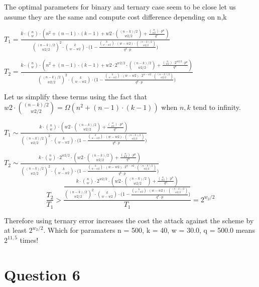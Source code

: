\documentclass[12pt]{article}
\begin{document}
The optimal parameters for binary and ternary case seem to be close let us assume they are the same and compute cost difference depending on n,k


$T_1 = \frac{ k \cdot  \binom{n}{w} \cdot  (n^2 + (n-1)\cdot (k-1) + w2\cdot \binom{(n-k)/2}{w2/2} + \frac{\binom{n}{w2}\cdot p^n}{q^n})}{\binom{(n-k)/2}{w2/2}^2 \cdot  \binom{k}{w-w2} \cdot  \big( 1 - \frac{\binom{k}{w-w2} \cdot  (w-w2) \cdot  \binom{(n-k)/2}{w2/2} }{ q^{k}\cdot p } \big)}$


$T_2 = \frac{ k \cdot  \binom{n}{w} \cdot  (n^2 + (n-1)\cdot (k-1) + w2\cdot 2^{w2/2}\cdot \binom{(n-k)/2}{w2/2} + \frac{\binom{n}{w2}\cdot 2^{w2/2}\cdot p^n}{q^n})}{\binom{(n-k)/2}{w2/2}^2 \cdot  \binom{k}{w-w2} \cdot  \big( 1 - \frac{\binom{k}{w-w2} \cdot  (w-w2) \cdot  2^{w-w2} \cdot  \binom{(n-k)/2}{w2/2} }{ q^{k}\cdot p } \big)}$

Let us simplify these terms using the fact that $w2\cdot \binom{(n-k)/2}{w2/2} = \Omega(n^2 + (n-1)\cdot (k-1))$ when $n,k$ tend to infinity.

$T_1 \sim \frac{ k \cdot  \binom{n}{w} \cdot  (w2\cdot \binom{(n-k)/2}{w2/2} + \frac{\binom{n}{w2}\cdot p^n}{q^n})}{\binom{(n-k)/2}{w2/2}^2 \cdot  \binom{k}{w-w2} \cdot  \big( 1 - \frac{\binom{k}{w-w2} \cdot  (w-w2) \cdot  \binom{(n-k)/2}{w2/2} }{ q^{k}\cdot p } \big)}$


$T_2 \sim \frac{ k \cdot  \binom{n}{w} \cdot  2^{w2/2} \cdot  (w2\cdot \binom{(n-k)/2}{w2/2} + \frac{\binom{n}{w2}\cdot p^n}{q^n})}{\binom{(n-k)/2}{w2/2}^2 \cdot  \binom{k}{w-w2} \cdot  \big( 1 - \frac{\binom{k}{w-w2} \cdot  (w-w2) \cdot  2^{w-w2} \cdot  \binom{(n-k)/2}{w2/2} }{ q^{k}\cdot p } \big)}$
\[
    \frac{T_2}{T_1} > \frac{\frac{ k \cdot  \binom{n}{w} \cdot  2^{w2/2} \cdot  (w2\cdot \binom{(n-k)/2}{w2/2} + \frac{\binom{n}{w2}\cdot p^n}{q^n})}{\binom{(n-k)/2}{w2/2}^2 \cdot  \binom{k}{w-w2} \cdot  \big( 1 - \frac{\binom{k}{w-w2} \cdot  (w-w2) \cdot  \binom{(n-k)/2}{w2/2} }{ q^{k}\cdot p } \big)}}{T_1} = 2^{w_2/2}
\]

Therefore using ternary error increases the cost the attack against the scheme by at least $2^{w_2/2}$. Which for paramaters n = 500, k = 40, w = 30.0, q = 500.0 means $2^{11,5}$ times!

\section{Question 6}
\end{document}
